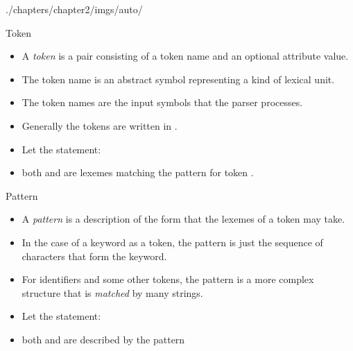 \begin{graphicspathcontext}{{./chapters/chapter2/imgs/auto/}}
\begin{bibunit}[apalike]
\begin{frame}{Token}
	\begin{itemize}
	\item A \emph{token} is a pair consisting of a token name and an optional attribute value.
	\item The token name is an abstract symbol representing a kind of lexical unit.
	\item The token names are the input symbols that the parser processes.
	\item Generally the tokens are written in .
	\end{itemize}
	\vfill
	\begin{example}
		\begin{itemize}
		\item Let the statement: 
		\item both  and  are lexemes matching the pattern for token .
		\end{itemize}
	\end{example}
\end{frame}

\begin{frame}{Pattern}
	\begin{itemize}
	\item A \emph{pattern} is a description of the form that the lexemes of a token may take.
	\item In the case of a keyword as a token, the pattern is just the sequence of characters that form the keyword.
	\item For identifiers and some other tokens, the pattern is a more complex structure that is \emph{matched} by many strings.
	\end{itemize}
	\vfill
	\begin{example}
		\begin{itemize}
		\item Let the statement: \code{\id{printf}(\str{"Total = \%d{\textbackslash}n"}, \id{score});}
		\item both  and  are described by the pattern \code{[\_a-zA-Z][\_a-zA-Z]*}
		\end{itemize}
	\end{example}
\end{frame}


\end{bibunit}
\end{graphicspathcontext}
